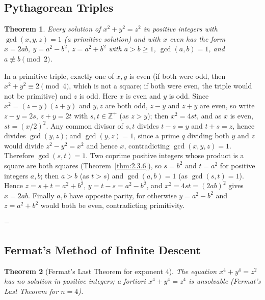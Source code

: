 \documentclass[11pt]{article}
\makeatletter
\theoremstyle{ntstyle}
\newtheorem{theorem}{Theorem}[subsection]
\let\nt@closedisplay\]
\def\nt@guardedclose{\@ifnextchar\par{\nt@closeafterpar}{\@ifnextchar\end{\postdisplaypenalty\@M\nt@closedisplay}{\nt@closedisplay}}}
\def\nt@closeafterpar\par{\@ifnextchar\par{\nt@closeafterpar}{\@ifnextchar\end{\postdisplaypenalty\@M\nt@closedisplay\par}{\nt@closedisplay\par}}}
\renewenvironment{proof}[1][\proofname]{\par
  \pushQED{\qed}\normalfont\topsep\medskipamount\edef\nt@afterproof{\@endparpenalty=\the\@endparpenalty\relax}\@beginparpenalty\@M\@endparpenalty\@M\let\]\nt@guardedclose\trivlist\item[]\textit{#1\@addpunct{.}} \ignorespaces}{\ifvmode\addpenalty\@M\fi\popQED\nt@afterproof\endtrivlist\@endpefalse}
\makeatother
\begin{document}
\subsection{Pythagorean Triples}

\begin{theorem}\label{thm:8.4.1} Every solution of
	$x^2+y^2=z^2$ in positive integers with $\gcd(x,y,z)=1$ (a primitive
	solution) and with $x$ even has the
	form $x=2ab,\ y=a^2-b^2,\ z=a^2+b^2$ with $a>b\ge1$, $\gcd(a, b)=1$, and
	$a\not\equiv b\pmod{2}$.

\end{theorem}

\begin{proof} In a primitive triple, exactly one of $x,y$
	is even (if both were odd, then $x^2+y^2\equiv2\pmod{4}$, which is not a square; if both
	were even, the triple would not be primitive) and $z$ is odd. Here $x$ is even and $y$ is odd. Since $x^2=(z-y)(z+y)$ and $y,z$ are both odd, $z-y$ and $z+y$
	are even, so write $z-y=2s$, $z+y=2t$ with $s,t\in\mathbb{Z}^+$ (as
	$z>y$); then $x^2=4st$, and as $x$ is even, $st=(x/2)^2$. Any common
	divisor of $s,t$ divides $t-s=y$ and $t+s=z$, hence divides
	$\gcd(y, z)$; and $\gcd(y, z)=1$, since a prime $q$ dividing both $y$ and
	$z$ would divide $z^2-y^2=x^2$ and hence $x$, contradicting
	$\gcd(x,y,z)=1$. Therefore $\gcd(s, t)=1$. Two coprime positive
	integers whose product is a square are both squares (Theorem~\ref{thm:2.3.6}), so
	$s=b^2$ and $t=a^2$ for positive integers $a,b$; then $a>b$ (as
	$t>s$) and $\gcd(a, b)=1$ (as $\gcd(s, t)=1$). Hence $z=s+t=a^2+b^2$,
	$y=t-s=a^2-b^2$, and $x^2=4st=(2ab)^2$ gives $x=2ab$. Finally $a,b$
	have opposite parity, for otherwise $y=a^2-b^2$ and $z=a^2+b^2$
	would both be even, contradicting primitivity.

\end{proof}
\subsection{Fermat's Method of Infinite Descent}

\begin{theorem}[Fermat's Last Theorem for exponent $4$]\label{thm:8.5.1} The equation
	$x^{4}+y^{4}=z^{2}$ has no solution in positive integers; a fortiori
	$x^{4}+y^{4}=z^{4}$ is unsolvable (Fermat's Last Theorem for $n=4$).

\end{theorem}
\end{document}
